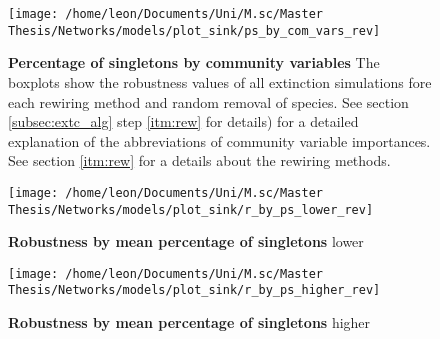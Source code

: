 \documentclass[12pt,a4paper]{article}
\begin{document}
\begin{figure}[H]
	 \centering
	 \texttt{[image: /home/leon/Documents/Uni/M.sc/Master Thesis/Networks/models/plot\_sink/ps\_by\_com\_vars\_rev]}
	 	 \captionsetup{width = .8\textwidth}
	 \caption{\textbf{Percentage of singletons by community variables} The boxplots show the robustness values of all extinction simulations fore each rewiring method and random removal of species. See section \ref{subsec:extc_alg} step \ref{itm:rew} for details) for a detailed explanation of the abbreviations of community variable importances. See section \ref{itm:rew} for a details about the rewiring methods.}
	 \label{fig:ps_by_cv}
\end{figure}

\begin{figure}[H]
	 \centering
	 \texttt{[image: /home/leon/Documents/Uni/M.sc/Master Thesis/Networks/models/plot\_sink/r\_by\_ps\_lower\_rev]}
	 \captionsetup{width = .8\textwidth}
	 \caption{\textbf{Robustness by mean percentage of singletons} lower}
	 \label{fig:r_by_ps_lower}
\end{figure}

\begin{figure}[H]
	 \centering
	 \texttt{[image: /home/leon/Documents/Uni/M.sc/Master Thesis/Networks/models/plot\_sink/r\_by\_ps\_higher\_rev]}
	 	 \captionsetup{width = .8\textwidth}
	 \caption{\textbf{Robustness by mean percentage of singletons} higher}
	 \label{fig:r_by_ps_higher}
\end{figure}


\end{document}
